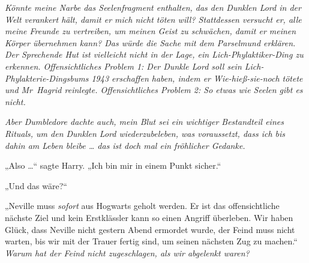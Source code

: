 \emph{Könnte meine \emph{Narbe} das Seelenfragment enthalten, das den Dunklen Lord in der Welt verankert hält, damit er mich nicht töten will? Stattdessen versucht er, alle meine Freunde zu vertreiben, um meinen Geist zu schwächen, damit er meinen Körper übernehmen kann? Das würde die Sache mit dem Parselmund erklären. Der Sprechende Hut ist vielleicht nicht in der Lage, ein Lich-Phylaktiker-Ding zu erkennen. Offensichtliches Problem 1: Der Dunkle Lord soll sein Lich-Phylakterie-Dingsbums 1943 erschaffen haben, indem er Wie-hieß-sie-noch tötete und Mr~Hagrid reinlegte. Offensichtliches Problem 2: So etwas wie Seelen gibt es nicht.}

\emph{Aber Dumbledore dachte auch, mein Blut sei ein wichtiger Bestandteil eines Rituals, um den Dunklen Lord wiederzubeleben, was voraussetzt, dass ich bis dahin am Leben bleibe … das ist doch mal ein fröhlicher Gedanke.}

„Also …“ sagte Harry.
„Ich bin mir in einem Punkt sicher.“

„Und das wäre?“

„Neville muss \emph{sofort} aus Hogwarts geholt werden. Er ist das offensichtliche nächste Ziel und kein Erstklässler kann so einen Angriff überleben. Wir haben Glück, dass Neville nicht gestern Abend ermordet wurde, der Feind muss nicht warten, bis wir mit der Trauer fertig sind, um seinen nächsten Zug zu machen.“ \emph{Warum hat der Feind nicht zugeschlagen, als wir abgelenkt waren?}

